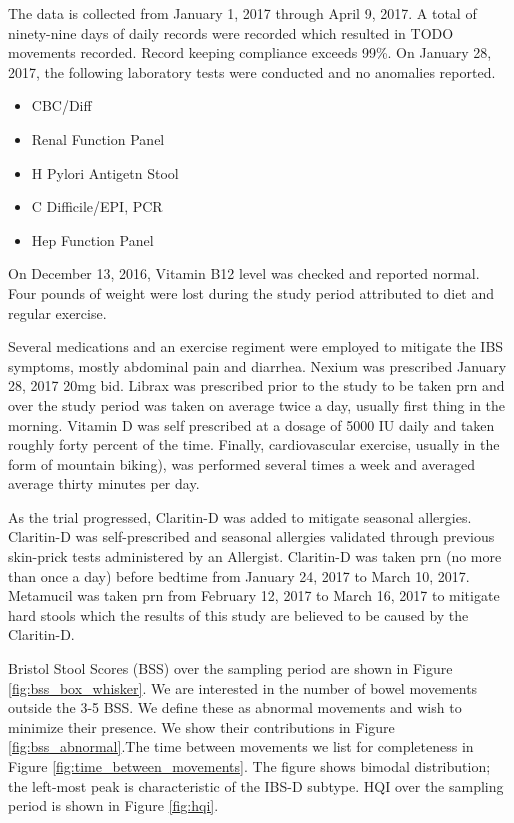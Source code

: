 \documentclass[conference]{IEEEtran}
\begin{document}
The data is collected from January 1, 2017 through April 9, 2017. A total of ninety-nine days of daily records were recorded which resulted in TODO movements recorded.  Record keeping compliance exceeds 99\%. On January 28, 2017, the following laboratory tests were conducted and no anomalies reported.
\begin{itemize}
\item CBC/Diff
\item Renal Function Panel
\item H Pylori Antigetn Stool
\item C Difficile/EPI, PCR
\item Hep Function Panel
\end{itemize}
On December 13, 2016, Vitamin B12 level was checked and reported normal. Four pounds of weight were lost during the study period attributed to diet and regular exercise.

Several medications and an exercise regiment were employed to mitigate the IBS symptoms, mostly abdominal pain and diarrhea. Nexium was prescribed January 28, 2017 20mg bid.  Librax was prescribed prior to the study to be taken prn and over the study period was taken on average twice a day, usually first thing in the morning. Vitamin D was self prescribed at a dosage of 5000 IU daily and taken roughly forty percent of the time. Finally, cardiovascular exercise, usually in the form of mountain biking), was performed several times a week and averaged average thirty minutes per day.

As the trial progressed, Claritin-D was added to mitigate seasonal allergies. Claritin-D was self-prescribed and seasonal allergies validated through previous skin-prick tests administered by an Allergist. Claritin-D was taken prn (no more than once a day) before bedtime from January 24, 2017 to March 10, 2017. Metamucil was taken prn from February 12, 2017 to March 16, 2017 to mitigate hard stools which the results of this study are believed to be caused by the Claritin-D.

Bristol Stool Scores (BSS) over the sampling period are shown in Figure \ref{fig:bss_box_whisker}. We are interested in the number of bowel movements outside the 3-5 BSS. We define these as abnormal movements and wish to minimize their presence.  We show their contributions in Figure \ref{fig:bss_abnormal}.The time between movements we list for completeness in Figure \ref{fig:time_between_movements}.  The figure shows bimodal distribution; the left-most peak is characteristic of the IBS-D subtype. HQI over the sampling period is shown in Figure \ref{fig:hqi}.
\end{document}
